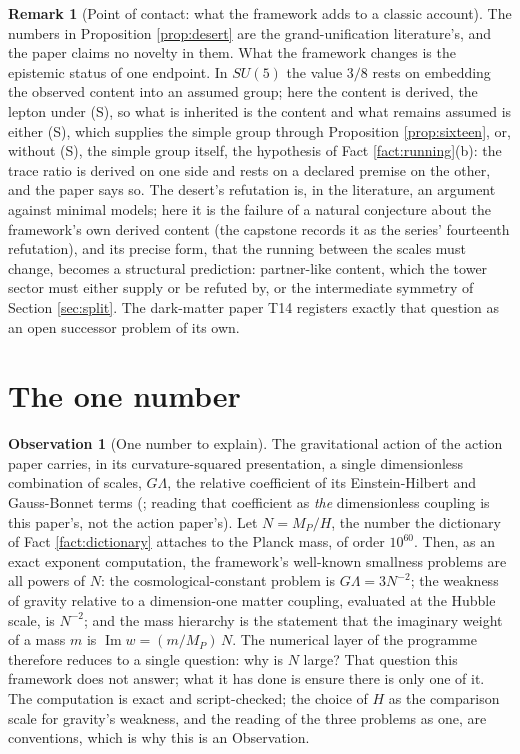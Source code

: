 \documentclass[11pt]{article}
\theoremstyle{definition}
\newtheorem{remark}[theorem]{Remark}
\newtheorem{observation}[theorem]{Observation}
\begin{document}
\begin{remark}[Point of contact: what the framework adds to a classic account]\label{rem:classic}
The numbers in Proposition \ref{prop:desert} are the grand-unification literature's, and the paper claims no novelty in them. What the framework changes is the epistemic status of one endpoint. In $SU(5)$ the value $3/8$ rests on embedding the observed content into an assumed group; here the content is derived, the lepton under (S), so what is inherited is the content and what remains assumed is either (S), which supplies the simple group through Proposition \ref{prop:sixteen}, or, without (S), the simple group itself, the hypothesis of Fact \ref{fact:running}(b): the trace ratio is derived on one side and rests on a declared premise on the other, and the paper says so. The desert's refutation is, in the literature, an argument against minimal models; here it is the failure of a natural conjecture about the framework's own derived content (the capstone \cite{ButlerT17} records it as the series' fourteenth refutation), and its precise form, that the running between the scales must change, becomes a structural prediction: partner-like content, which the tower sector must either supply or be refuted by, or the intermediate symmetry of Section \ref{sec:split}. The dark-matter paper T14 \cite{ButlerT14} registers exactly that question as an open successor problem of its own.
\end{remark}

\section{The one number}\label{sec:N}

\begin{observation}[One number to explain]\label{obs:N}
The gravitational action of the action paper carries, in its curvature-squared presentation, a single dimensionless combination of scales, $G\Lambda$, the relative coefficient of its Einstein-Hilbert and Gauss-Bonnet terms (\cite[Thm.~3.1(2)]{ButlerT10}; reading that coefficient as \emph{the} dimensionless coupling is this paper's, not the action paper's). Let $N = M_{P}/H$, the number the dictionary of Fact \ref{fact:dictionary} attaches to the Planck mass, of order $10^{60}$. Then, as an exact exponent computation, the framework's well-known smallness problems are all powers of $N$: the cosmological-constant problem is $G\Lambda = 3N^{-2}$; the weakness of gravity relative to a dimension-one matter coupling, evaluated at the Hubble scale, is $N^{-2}$; and the mass hierarchy is the statement that the imaginary weight of a mass $m$ is $\operatorname{Im} w = (m/M_{P})\,N$. The numerical layer of the programme therefore reduces to a single question: why is $N$ large? That question this framework does not answer; what it has done is ensure there is only one of it. The computation is exact and script-checked; the choice of $H$ as the comparison scale for gravity's weakness, and the reading of the three problems as one, are conventions, which is why this is an Observation.
\end{observation}
\end{document}
